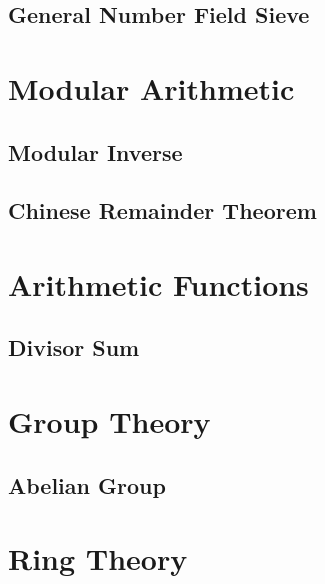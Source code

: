 \documentclass[12pt]{extarticle}
\begin{document}
\subsection*{General Number Field Sieve}
\section*{Modular Arithmetic}
\subsection*{Modular Inverse}
\subsection*{Chinese Remainder Theorem}
\section*{Arithmetic Functions}
\subsection*{Divisor Sum}
\section*{Group Theory}
\subsection*{Abelian Group}
\section*{Ring Theory}
\end{document}
